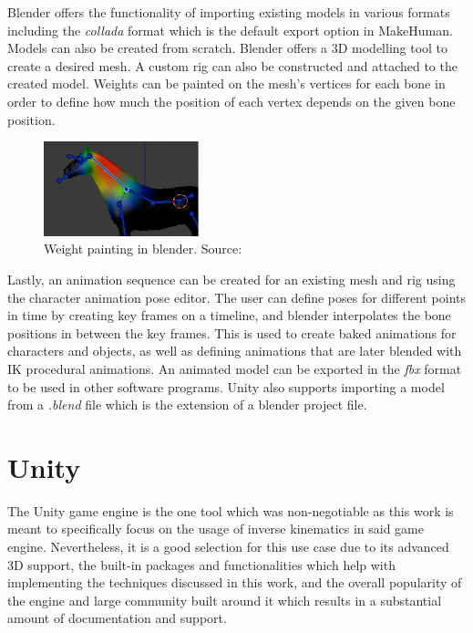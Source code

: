 
Blender offers the functionality of importing existing models in various formats
including the \textit{collada} format \cite{collada} which is the default export
option in MakeHuman. Models can also be created from scratch. Blender offers
a 3D modelling tool to create a desired mesh. A custom rig can also be
constructed and attached to the created model. Weights can be painted on the
mesh's vertices for each bone in order to define how much the position of each vertex
depends on the given bone position. 

\begin{figure}[!h]
    \centering
    \includegraphics[width=0.4\textwidth]{grafika/weight_paint.eps}
    \caption{Weight painting in blender. Source: \cite{unity_weights}}
    \label{fig:weights}
\end{figure}

Lastly, an animation sequence can be created for an existing mesh and rig using
the character animation pose editor. The user can define poses for different
points in time by creating key frames on a timeline, and blender interpolates the
bone positions in between the key frames. This is used to create baked animations
for characters and objects, as well as defining animations that are later
blended with IK procedural animations. An animated model can be exported in the
\textit{fbx} format to be used in other software programs. Unity also supports
importing a model from a \textit{.blend} file which is the extension of
a blender project file. 


\section{Unity}
The Unity game engine is the one tool which was non-negotiable as this work
is meant to specifically focus on the usage of inverse kinematics in said game
engine. Nevertheless, it is a good selection for this use case due to its
advanced 3D support, the built-in packages and functionalities which help
with implementing the techniques discussed in this work, and the overall popularity of
the engine and large community built around it which results in a substantial
amount of documentation and support. 

